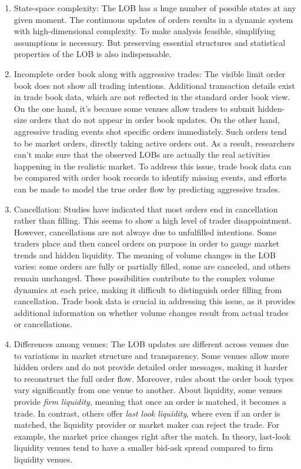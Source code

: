 \begin{enumerate}
    \item State-space complexity: The LOB has a huge number of possible states at any given moment. The continuous updates of orders results in a dynamic system with high-dimensional complexity. To make analysis feasible, simplifying assumptions is necessary. But preserving essential structures and statistical properties of the LOB is also indispensable.

    \item Incomplete order book along with aggressive trades: The visible limit order book does not show all trading intentions. Additional transaction details exist in trade book data, which are not reflected in the standard order book view. On the one hand, it's because some venues allow traders to submit hidden-size orders that do not appear in order book updates. On the other hand, aggressive trading events shot specific orders immediately. Such orders tend to be market orders, directly taking active orders out. As a result, researchers can't make sure that the observed LOBs are actually the real activities happening in the realistic market. To address this issue, trade book data can be compared with order book records to identify missing events, and efforts can be made to model the true order flow by predicting aggressive trades.

    \item Cancellation: Studies have indicated that most orders end in cancellation rather than filling. This seems to show a high level of trader disappointment. However, cancellations are not always due to unfulfilled intentions. Some traders place and then cancel orders on purpose in order to gauge market trends and hidden liquidity. The meaning of volume changes in the LOB varies: some orders are fully or partially filled, some are canceled, and others remain unchanged. These possibilities contribute to the complex volume dynamics at each price, making it difficult to distinguish order filling from cancellation. Trade book data is crucial in addressing this issue, as it provides additional information on whether volume changes result from actual trades or cancellations.

    \item Differences among venues: The LOB updates are different across venues due to variations in market structure and transparency. Some venues allow more hidden orders and do not provide detailed order messages, making it harder to reconstruct the full order flow. Moreover, rules about the order book types vary significantly from one venue to another.
    About liquidity, some venues provide \textit{firm liquidity}, meaning that once an order is matched, it becomes a trade. In contrast, others offer \textit{last look liquidity}, where even if an order is matched, the liquidity provider or market maker can reject the trade. For example, the market price changes right after the match. In theory, last-look liquidity venues tend to have a smaller bid-ask spread compared to firm liquidity venues.
\end{enumerate}

